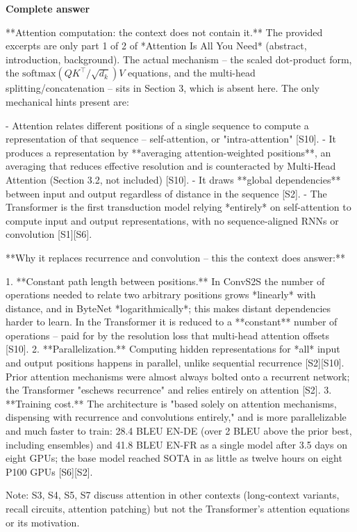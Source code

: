 \documentclass[10pt]{article}
\begin{document}
\textbf{Complete answer}
\begin{AnswerText}
**Attention computation: the context does not contain it.** The provided excerpts are only part 1 of 2 of *Attention Is All You Need* (abstract, introduction, background). The actual mechanism -- the scaled dot-product form, the $\mathrm{softmax}(QK^\top/\sqrt{d_k})V$ equations, and the multi-head splitting/concatenation -- sits in Section 3, which is absent here. The only mechanical hints present are:

- Attention relates different positions of a single sequence to compute a representation of that sequence -- self-attention, or "intra-attention" [S10].
- It produces a representation by **averaging attention-weighted positions**, an averaging that reduces effective resolution and is counteracted by Multi-Head Attention (Section 3.2, not included) [S10].
- It draws **global dependencies** between input and output regardless of distance in the sequence [S2].
- The Transformer is the first transduction model relying *entirely* on self-attention to compute input and output representations, with no sequence-aligned RNNs or convolution [S1][S6].

**Why it replaces recurrence and convolution -- this the context does answer:**

1. **Constant path length between positions.** In ConvS2S the number of operations needed to relate two arbitrary positions grows *linearly* with distance, and in ByteNet *logarithmically*; this makes distant dependencies harder to learn. In the Transformer it is reduced to a **constant** number of operations -- paid for by the resolution loss that multi-head attention offsets [S10].
2. **Parallelization.** Computing hidden representations for *all* input and output positions happens in parallel, unlike sequential recurrence [S2][S10]. Prior attention mechanisms were almost always bolted onto a recurrent network; the Transformer "eschews recurrence" and relies entirely on attention [S2].
3. **Training cost.** The architecture is "based solely on attention mechanisms, dispensing with recurrence and convolutions entirely," and is more parallelizable and much faster to train: 28.4 BLEU EN-DE (over 2 BLEU above the prior best, including ensembles) and 41.8 BLEU EN-FR as a single model after 3.5 days on eight GPUs; the base model reached SOTA in as little as twelve hours on eight P100 GPUs [S6][S2].

Note: S3, S4, S5, S7 discuss attention in other contexts (long-context variants, recall circuits, attention patching) but not the Transformer's attention equations or its motivation.
\end{AnswerText}
\end{document}
